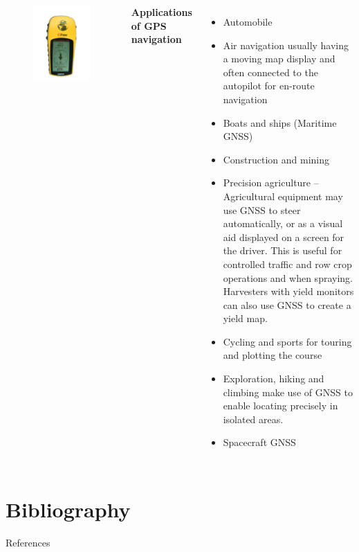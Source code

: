 \documentclass[11pt,dvipsnames,ignorenonframetext,aspectratio=169]{beamer}
\providecommand{\tightlist}{%
  \setlength{\itemsep}{0pt}\setlength{\parskip}{0pt}}
\newcommand{\bcolumns}{\begin{columns}[T, onlytextwidth]}
\newcommand{\ecolumns}{\end{columns}}
\begin{document}
\begin{frame}{}
\protect\hypertarget{section-3}{}
\bcolumns
{}

\begin{figure}
\includegraphics[width=0.4\linewidth]{../images/GPS_navigating_home} \end{figure}

\small

\textbf{Applications of GPS navigation}

\begin{itemize}
\tightlist
\item
  Automobile
\item
  Air navigation usually having a moving map display and often connected
  to the autopilot for en-route navigation
\item
  Boats and ships (Maritime GNSS)
\item
  Construction and mining
\item
  Precision agriculture -- Agricultural equipment may use GNSS to steer
  automatically, or as a visual aid displayed on a screen for the
  driver. This is useful for controlled traffic and row crop operations
  and when spraying. Harvesters with yield monitors can also use GNSS to
  create a yield map.
\item
  Cycling and sports for touring and plotting the course
\item
  Exploration, hiking and climbing make use of GNSS to enable locating
  precisely in isolated areas.
\item
  Spacecraft GNSS
\end{itemize}

\ecolumns
\end{frame}

\hypertarget{bibliography}{%
\section{Bibliography}\label{bibliography}}

\begin{frame}{References}
\protect\hypertarget{references}{}
\end{frame}
\end{document}
